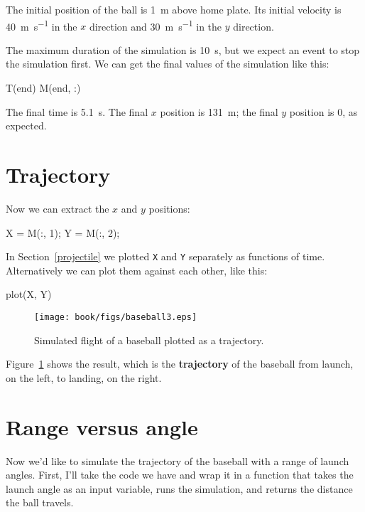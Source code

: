 The initial position of the ball is \SI{1}{\meter} above home plate.  Its initial velocity is \SI{40}{\meter\per\second} in the $x$ direction and \SI{30}{\meter\per\second} in the $y$ direction.


The maximum duration of the simulation is \SI{10}{\second}, but we expect an event to stop the simulation first.  We can get the final values of the simulation like this:
    
\begin{code}
    T(end)
    M(end, :)
\end{code}

The final time is \SI{5.1}{\second}.  The final $x$ position is \SI{131}{\meter}; the final $y$ position is 0, as expected.


\section{Trajectory}

Now we can extract the $x$ and $y$ positions:

\begin{code}
    X = M(:, 1);
    Y = M(:, 2);
\end{code}

In Section~\ref{projectile} we plotted {\tt X} and {\tt Y} separately as functions of time.  Alternatively we can plot them against each other, like this:

\begin{code}
    plot(X, Y)
\end{code}

\begin{figure}
\centerline{\texttt{[image: book/figs/baseball3.eps]}}
\caption{Simulated flight of a baseball plotted as a trajectory.}
\label{fig:baseball3}
\end{figure}

Figure~\ref{fig:baseball3} shows the result, which is the {\bf trajectory} of the baseball from launch, on the left, to landing, on the right.



\section{Range versus angle}

Now we'd like to simulate the trajectory of the baseball with a range of launch angles.  First, I'll take the code we have and wrap it in a function that takes the launch angle as an input variable, runs the simulation, and returns the distance the ball travels.

